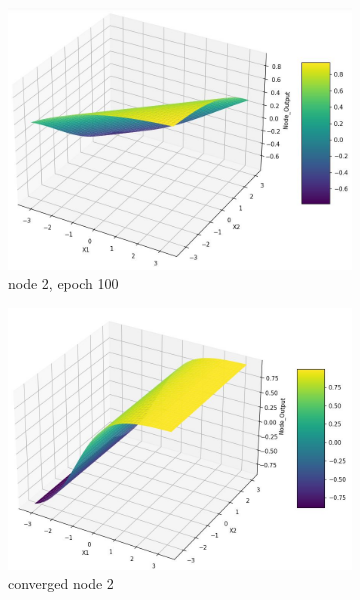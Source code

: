 \documentclass[11pt]{article}
\begin{document}
\begin{figure}[h]
\begin{subfigure}[b]{0.18\textwidth}
	\includegraphics[scale=0.14]{hidden1_n2_e100.jpg}
	\caption{node 2, epoch 100}
	\label{fig:fig2.1.4.9}
	\end{subfigure}
	\begin{subfigure}[b]{0.18\textwidth}
	\centering
	\includegraphics[scale=0.14]{hidden1_n2_c.jpg}
	\caption{converged node 2}
	\label{fig:fig2.1.4.10}
	\end{subfigure}
	\begin{subfigure}[b]{0.18\textwidth}
	\centering

\end{subfigure}
\end{figure}
\end{document}
